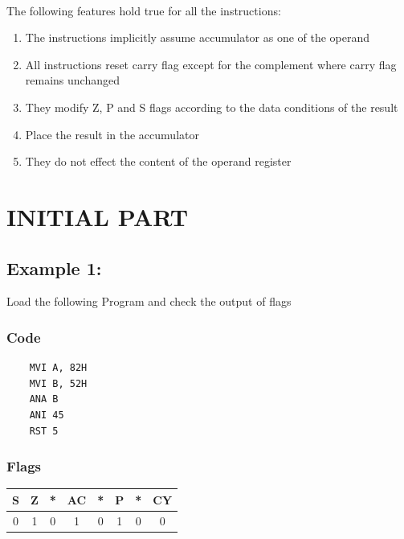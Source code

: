 \documentclass[]{report}
\begin{document}
\\
The following features hold true for all the instructions:
\begin{enumerate}
\item The instructions implicitly assume accumulator as one of the operand
\item All instructions reset carry flag except for the complement where carry flag remains unchanged
\item They modify Z, P and S flags according to the data conditions of the result
\item Place the result in the accumulator
\item They do not effect the content of the operand register
\end{enumerate}

\section*{INITIAL PART}
\subsection*{Example 1:}
Load the following Program and check the output of flags
\subsubsection{Code}
\begin{verbatim}
    MVI A, 82H
    MVI B, 52H
    ANA B
    ANI 45
    RST 5
\end{verbatim}
\subsubsection{Flags}
\begin{tabular}{cccccccc}
\hline
    S & Z & *  & AC & *  & P & *  & CY  \\
    \hline
    0&1&0&1&0&1&0&0\\
    \hline
\end{tabular}
\end{document}
